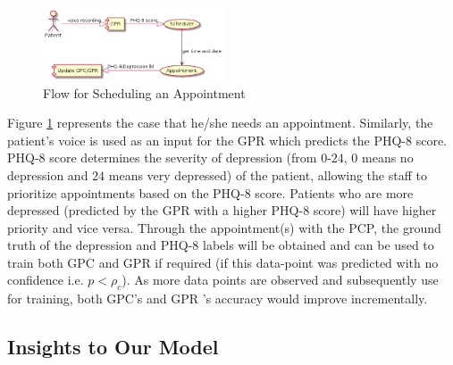 \documentclass{article}
\begin{document}
	\begin{figure}[h]
 		\begin{center}
		\includegraphics[width=0.48\textwidth]{appointment} 
  		\end{center}
  		\caption{Flow for Scheduling an Appointment}
  		\label{sch_app} 
 	\end{figure}

	Figure \ref{sch_app} represents the case that he/she needs an appointment. 
    Similarly, the patient's voice is used as an input for the GPR which predicts the PHQ-8 score. 
    PHQ-8 score determines the severity of depression (from $0$-$24$, $0$ means no depression and $24$ means very depressed) of the patient, allowing the staff to prioritize appointments based on the PHQ-8 score.
    Patients who are more depressed (predicted by the GPR with a higher PHQ-8 score) will have higher priority and vice versa.
    Through the appointment(s) with the PCP, the ground truth of the depression and PHQ-8 labels will be obtained and can be used to train both GPC and GPR if required (if this data-point was predicted with no confidence i.e. $p < \rho_c$).
    As more data points are observed and subsequently use for training, both GPC's and GPR 's accuracy would improve incrementally.

    \subsection{Insights to Our Model}
\end{document}
